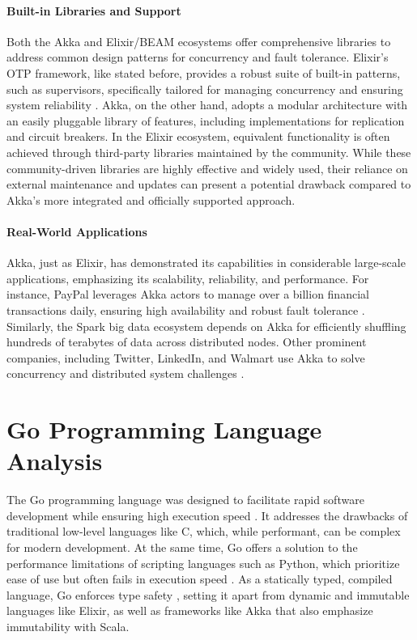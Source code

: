 \paragraph{Built-in Libraries and Support} Both the Akka and Elixir/\gls{BEAM} ecosystems offer comprehensive libraries to address common design patterns for concurrency and fault tolerance. Elixir’s \gls{OTP} framework, like stated before, provides a robust suite of built-in patterns, such as supervisors, specifically tailored for managing concurrency and ensuring system reliability \cite{erlang-concurrency-blog,elixir-docs-hexdocs}. Akka, on the other hand, adopts a modular architecture with an easily pluggable library of features, including implementations for replication and circuit breakers. In the Elixir ecosystem, equivalent functionality is often achieved through third-party libraries maintained by the community. While these community-driven libraries are highly effective and widely used, their reliance on external maintenance and updates can present a potential drawback compared to Akka’s more integrated and officially supported approach.

\paragraph{Real-World Applications} Akka, just as Elixir, has demonstrated its capabilities in considerable large-scale applications, emphasizing its scalability, reliability, and performance. For instance, PayPal leverages Akka actors to manage over a billion financial transactions daily, ensuring high availability and robust fault tolerance \cite{Bagherzadeh2020}. Similarly, the Spark big data ecosystem depends on Akka for efficiently shuffling hundreds of terabytes of data across distributed nodes. Other prominent companies, including Twitter, LinkedIn, and Walmart use Akka to solve concurrency and distributed system challenges \cite{Bagherzadeh2020,akka-docs}.

\section{Go Programming Language Analysis}

The Go programming language was designed to facilitate rapid software development while ensuring high execution speed \cite{Kennedy2016, Cox-Buday2017}. It addresses the drawbacks of traditional low-level languages like C, which, while performant, can be complex for modern development. At the same time, Go offers a solution to the performance limitations of scripting languages such as Python, which prioritize ease of use but often fails in execution speed \cite{Kennedy2016}. As a statically typed, compiled language, Go enforces type safety \cite{go-docs}, setting it apart from dynamic and immutable languages like Elixir, as well as frameworks like Akka that also emphasize immutability with Scala.

